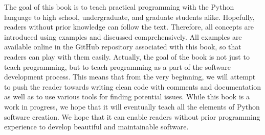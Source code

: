 %
The goal of this book is to teach practical programming with the Python language to high school, undergraduate, and graduate students alike.
Hopefully, readers without prior knowledge can follow the text.
Therefore, all concepts are introduced using examples and discussed comprehensively.
All examples are available online in the GitHub repository associated with this book, so that readers can play with them easily.
Actually, the goal of the book is not just to teach programming, but to teach programming as a part of the software development process.
This means that from the very beginning, we will attempt to push the reader towards writing clean code with comments and documentation as well as to use various tools for finding potential issues.
While this book is a work in progress, we hope that it will eventually teach all the elements of Python software creation.
We hope that it can enable readers without prior programming experience to develop beautiful and maintainable software.
%
